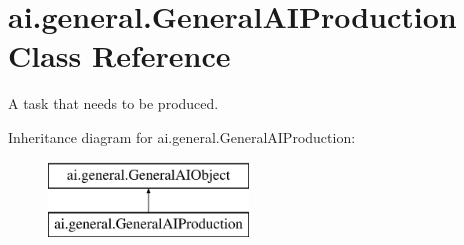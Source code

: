 \hypertarget{classai_1_1general_1_1_general_a_i_production}{
\section{ai.general.GeneralAIProduction Class Reference}
\label{classai_1_1general_1_1_general_a_i_production}
}


A task that needs to be produced.  


Inheritance diagram for ai.general.GeneralAIProduction:\begin{figure}[H]
\begin{center}
\leavevmode
\includegraphics[height=2.000000cm]{classai_1_1general_1_1_general_a_i_production}
\end{center}
\end{figure}
